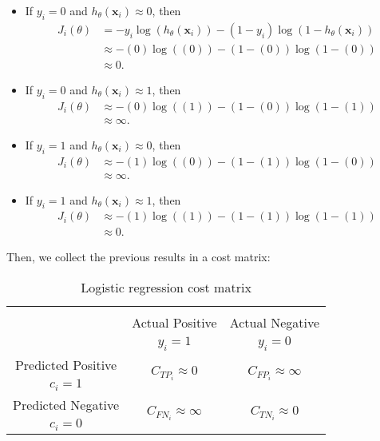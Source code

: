 \begin{itemize}
\item If $y_i=0$ and $h_\theta(\mathbf{x}_i) \approx 0$, then
\begin{align*}
 J_i(\theta) &= -y_i\log(h_\theta(\mathbf{x}_i)) -(1-y_i)\log(1-h_\theta(\mathbf{x}_i)) \nonumber \\
 &\approx -(0)\log((0)) -(1-(0))\log(1-(0)) \nonumber \\
 &\approx 0.
\end{align*}

\item If $y_i=0$ and $h_\theta(\mathbf{x}_i) \approx 1$, then
\begin{align*}
 J_i(\theta) &\approx -(0)\log((1)) -(1-(0))\log(1-(1)) \nonumber \\
 &\approx \infty.
\end{align*}

\item If $y_i=1$ and $h_\theta(\mathbf{x}_i) \approx 0$, then
\begin{align*}
 J_i(\theta) &\approx -(1)\log((0)) -(1-(1))\log(1-(0)) \nonumber \\
 &\approx \infty.
\end{align*}

\item If $y_i=1$ and $h_\theta(\mathbf{x}_i) \approx 1$, then
\begin{align*}
 J_i(\theta) &\approx -(1)\log((1)) -(1-(1))\log(1-(1)) \nonumber \\
 &\approx 0.
\end{align*}
\end{itemize}

\noindent Then, we collect the previous results in a cost matrix:
  \begin{table}[htbp]
    \centering
    \footnotesize
    \begin{tabular}{c|c|c}
      \multicolumn{3}{c}{}\\
      \multicolumn{1}{c|}{}  & Actual Positive& Actual Negative \\
      \multicolumn{1}{c|}{} & $y_i=1$& $y_i=0$ \\
      \hline
      Predicted Positive    & \multirow{ 2}{*}{$C_{{TP}_i}\approx 0$} & 
      \multirow{2}{*}{$C_{{FP}_i}\approx \infty$} \\
      $c_i=1$ & &\\
      \hline
      Predicted Negative    & \multirow{ 2}{*}{$C_{{FN}_i}\approx \infty$} & \multirow{ 
      2}{*}{$C_{{TN}_i}\approx 0$} \\
      $c_i=0$ & &\\
    \end{tabular}
    \caption{Logistic regression cost matrix}
    \label{tab:7:1}
  \end{table} 
  
